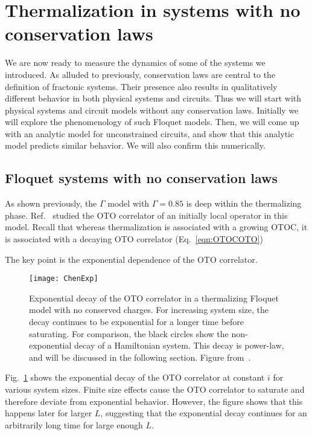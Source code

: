 \documentclass[a4paper,11pt]{article}
\begin{document}
\section{Thermalization in systems with no conservation laws} \label{sec:ncons}

We are now ready to measure the dynamics of some of the systems we introduced. As alluded to previously, conservation laws are central to the definition of fractonic systems. Their presence also results in qualitatively different behavior in both physical systems and circuits. Thus we will start with physical systems and circuit models without any conservation laws. Initially we will explore the phenomenology of such Floquet models. Then, we will come up with an analytic model for unconstrained circuits, and show that this analytic model predicts similar behavior. We will also confirm this numerically.

\subsection{Floquet systems with no conservation laws} \label{sub:fncons}

As shown previously, the $\Gamma$ model with $\Gamma=0.85$ is deep within the thermalizing phase. Ref.~\cite{ChenOtoc} studied the OTO correlator of an initially local operator in this model. Recall that whereas thermalization is associated with a growing OTOC, it is associated with a decaying OTO correlator (Eq.~\ref{eqn:OTOCOTO})

The key point is the exponential dependence of the OTO correlator. 
\begin{figure}
	\centering
	\texttt{[image: ChenExp]}
	\caption{Exponential decay of the OTO correlator in a thermalizing Floquet model with no conserved charges. For increasing system size, the decay continues to be exponential for a longer time before saturating. For comparison, the black circles show the non-exponential decay of a Hamiltonian system. This decay is power-law, and will be discussed in the following section. Figure from~\cite{ChenOtoc}.}
	\label{fig:ChenExp}
\end{figure}
Fig.~\ref{fig:ChenExp} shows the exponential decay of the OTO correlator at constant $i$ for various system sizes. Finite size effects cause the OTO correlator to saturate and therefore deviate from exponential behavior. However, the figure shows that this happens later for larger $L$, suggesting that the exponential decay continues for an arbitrarily long time for large enough $L$.
\end{document}
